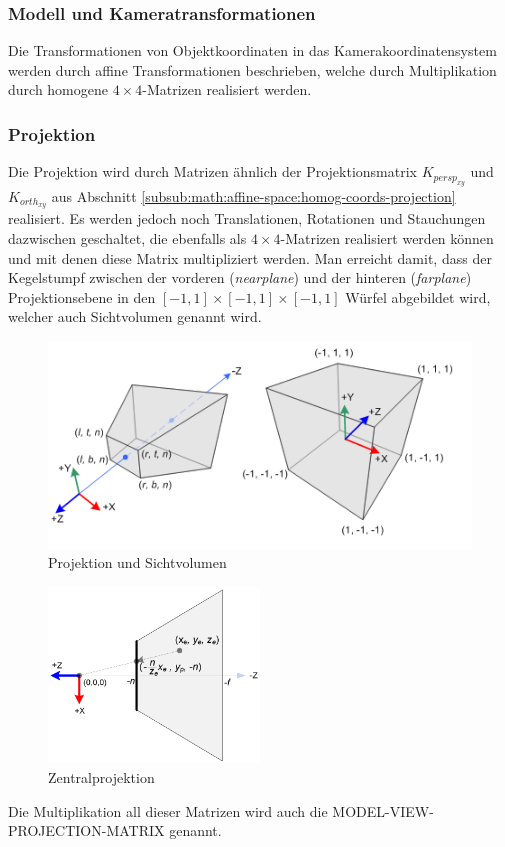 \subsubsection*{Modell und Kameratransformationen}
Die Transformationen von Objektkoordinaten in das Kamerakoordinatensystem werden durch affine Transformationen beschrieben, welche durch Multiplikation durch homogene $4 \times 4$-Matrizen realisiert werden. 

\subsubsection*{Projektion}
Die Projektion wird durch Matrizen ähnlich der Projektionsmatrix 
$K_{persp_{xy}}$ und $K_{orth_{xy}}$ aus Abschnitt 
\ref{subsub:math:affine-space:homog-coords-projection} realisiert. 
Es werden jedoch noch  Translationen, Rotationen und Stauchungen 
dazwischen geschaltet, die ebenfalls als $4 \times 4$-Matrizen realisiert werden 
können und mit denen diese Matrix multipliziert werden. 
Man erreicht damit, dass der Kegelstumpf zwischen der vorderen 
(\textit{nearplane}) und der hinteren (\textit{farplane}) Projektionsebene in 
den $[-1,1] \times [-1,1] \times [-1,1] $ Würfel abgebildet wird, welcher auch 
Sichtvolumen genannt wird. 

\begin{figure}[H]
    \centering
    \includegraphics[width=1.0\textwidth]{images/gl_projectionmatrix01.png}
    \caption{Projektion und Sichtvolumen}
    \label{fig:projection-sight-vol}
\end{figure}

\begin{figure}[H]
    \centering
    \includegraphics[width=0.5\textwidth]{images/gl_projectionmatrix03.png}
    \caption{Zentralprojektion}
    \label{fig:projection-sight-vol}
\end{figure}
Die Multiplikation all dieser Matrizen wird auch die MODEL-VIEW-PROJECTION-MATRIX genannt. 

